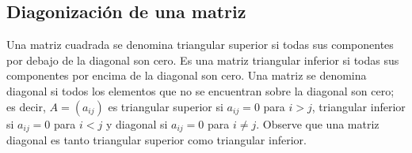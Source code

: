 \begin{}
\begin{exercise}
\end{exercise}
\subsection{Diagonización de una matriz}
\begin{definition}
Una matriz cuadrada se denomina triangular superior si todas sus componentes por debajo de la diagonal son cero. Es una matriz triangular inferior si todas sus componentes por encima de la diagonal son cero. Una matriz se denomina diagonal si todos los elementos que no se encuentran sobre la diagonal son cero; es decir, \( A = (a_{ij}) \) es triangular superior si \( a_{ij} = 0 \) para \( i > j \), triangular inferior si \( a_{ij} = 0 \) para \( i < j \) y diagonal si \( a_{ij} = 0 \) para \( i \neq j \). Observe que una matriz diagonal es tanto triangular superior como triangular inferior.


\end{definition}
\end{}
